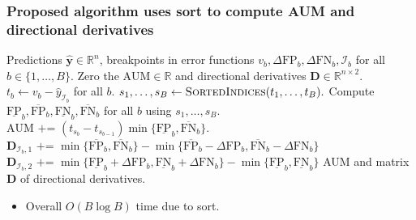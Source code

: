 \documentclass{beamer}
\begin{document}
\begin{frame}
  \frametitle{Proposed algorithm uses sort to compute AUM and directional derivatives}

\small
\begin{algorithmic}[1]
  Predictions $\mathbf{\hat y}\in\mathbb R^n$, 
  breakpoints in error functions $v_b,\Delta\text{FP}_b,\Delta\text{FN}_b,\mathcal I_b$ for all $b\in\{1,\dots,B\}$.
  \STATE Zero the $\text{AUM}\in\mathbb R$ and directional derivatives $\mathbf D\in\mathbb R^{n\times 2}$.\label{line:init-zero}
  \STATE $t_b\gets v_b - \hat y_{\mathcal I_b}$ for all $b$.\label{line:compute-thresh}
  \STATE $s_1,\dots,s_B\gets \textsc{SortedIndices}(t_1,\dots,t_B).$\label{line:sorted-indices}
  \STATE Compute $\underline{\text{FP}}_b,\overline{\text{FP}}_b,\underline{\text{FN}}_b,\overline{\text{FN}}_b$ for all $b$ using $s_1,\dots,s_B$.
  \label{line:for-intervals}
  \STATE $\text{AUM} \text{ += } (t_{s_b} - t_{s_{b-1}}) \min\{\underline{\text{FP}}_b, \overline{\text{FN}}_b\} $.\label{line:AUM}
  \ENDFOR
  \label{line:for-breakpoints}
  \STATE\label{line:D_lo} $\mathbf D_{\mathcal I_b,1} \text{ += } \min\{
  \overline{\text{FP}}_b , 
  \overline{\text{FN}}_b 
  \}
  -
  \min\{
  \overline{\text{FP}}_b - \Delta\text{FP}_b, 
  \overline{\text{FN}}_b - \Delta\text{FN}_b
  \}$
  \STATE\label{line:D_hi} $\mathbf D_{\mathcal I_b,2} \text{ += } \min\{
  \underline{\text{FP}}_b + \Delta\text{FP}_b, 
  \underline{\text{FN}}_b + \Delta\text{FN}_b
  \}
  -
  \min\{
  \underline{\text{FP}}_b , 
  \underline{\text{FN}}_b 
  \}$
  \ENDFOR
   AUM and matrix $\mathbf D$ of directional derivatives.
\end{algorithmic}
\begin{itemize}
\item 
 Overall $O(B\log B)$ time due to sort.
\end{itemize}
  
\end{frame}
\end{document}
